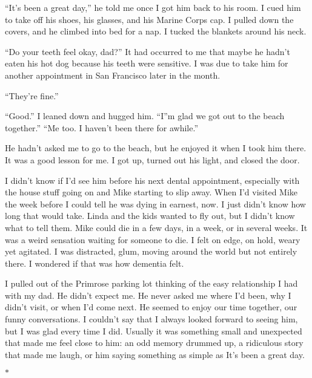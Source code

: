 \documentclass[12pt]{book}
\begin{document}
``It's been a great day,'' he told me once I got him back to his room. I cued him to take off his shoes, his glasses, and his Marine Corps cap. I pulled down the covers, and he climbed into bed for a nap. I tucked the blankets around his neck.

``Do your teeth feel okay, dad?'' It had occurred to me that maybe he hadn't eaten his hot dog because his teeth were sensitive. I was due to take him for another appointment in San Francisco later in the month.

``They're fine.''

``Good.'' I leaned down and hugged him. ``I''m glad we got out to the beach together.'' ``Me too. I haven't been there for awhile.''

He hadn't asked me to go to the beach, but he enjoyed it when I took him there. It was a good lesson for me. I got up, turned out his light, and closed the door.

I didn't know if I'd see him before his next dental appointment, especially with the house stuff going on and Mike starting to slip away. When I'd visited Mike the week before I could tell he was dying in earnest, now. I just didn't know how long that would take. Linda and the kids wanted to fly out, but I didn't know what to tell them. Mike could die in a few days, in a week, or in several weeks. It was a weird sensation waiting for someone to die. I felt on edge, on hold, weary yet agitated. I was distracted, glum, moving around the world but not entirely there. I wondered if that was how dementia felt.

I pulled out of the Primrose parking lot thinking of the easy relationship I had with my dad. He didn't expect me. He never asked me where I'd been, why I didn't visit, or when I'd come next. He seemed to enjoy our time together, our funny conversations. I couldn't say that I always looked forward to seeing him, but I was glad every time I did. Usually it was something small and unexpected that made me feel close to him: an odd memory drummed up, a ridiculous story that made me laugh, or him saying something as simple as It's been a great day.

\begin{center}$*$\end{center}
\end{document}
